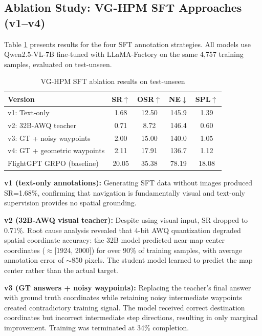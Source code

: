 \documentclass[conference]{IEEEtran}
\begin{document}
\subsection{Ablation Study: VG-HPM SFT Approaches (v1--v4)}

Table \ref{tab:ablation} presents results for the four SFT annotation strategies. All models use Qwen2.5-VL-7B fine-tuned with LLaMA-Factory on the same 4,757 training samples, evaluated on test-unseen.

\begin{table}[h]
\centering
\caption{VG-HPM SFT ablation results on test-unseen}
\label{tab:ablation}
\begin{tabular}{p{3.5cm}cccc}
\toprule
Version & SR$\uparrow$ & OSR$\uparrow$ & NE$\downarrow$ & SPL$\uparrow$ \\
\midrule
v1: Text-only & 1.68 & 12.50 & 145.9 & 1.39 \\
v2: 32B-AWQ teacher & 0.71 & 8.72 & 146.4 & 0.60 \\
v3: GT + noisy waypoints & 2.00 & 15.00 & 140.0 & 1.05 \\
v4: GT + geometric waypoints & 2.11 & 17.91 & 136.7 & 1.12 \\
\midrule
FlightGPT GRPO (baseline) & 20.05 & 35.38 & 78.19 & 18.08 \\
\bottomrule
\end{tabular}
\end{table}

\textbf{v1 (text-only annotations):} Generating SFT data without images produced SR=1.68\%, confirming that navigation is fundamentally visual and text-only supervision provides no spatial grounding.

\textbf{v2 (32B-AWQ visual teacher):} Despite using visual input, SR dropped to 0.71\%. Root cause analysis revealed that 4-bit AWQ quantization degraded spatial coordinate accuracy: the 32B model predicted near-map-center coordinates ($\approx$[1924, 2000]) for over 90\% of training samples, with average annotation error of $\sim$850 pixels. The student model learned to predict the map center rather than the actual target.

\textbf{v3 (GT answers + noisy waypoints):} Replacing the teacher's final answer with ground truth coordinates while retaining noisy intermediate waypoints created contradictory training signal. The model received correct destination coordinates but incorrect intermediate step directions, resulting in only marginal improvement. Training was terminated at 34\% completion.
\end{document}
